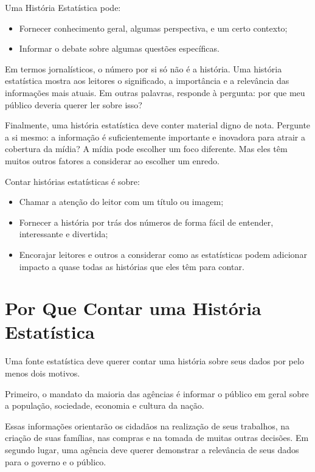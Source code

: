 Uma História Estatística pode:

\begin{itemize}
    \item Fornecer conhecimento geral, algumas perspectiva, e um certo contexto;
    \item Informar o debate sobre algumas questões específicas.
\end{itemize}


Em termos jornalísticos, o número por si só não é a história. Uma história estatística mostra aos leitores o significado, a importância e a relevância das informações mais atuais. Em outras palavras, responde à pergunta: por que meu público deveria querer ler sobre isso?\vskip0.3cm 

Finalmente, uma história estatística deve conter material digno de nota. Pergunte a si mesmo: a informação é suficientemente importante e inovadora para atrair a cobertura da mídia? A mídia pode escolher um foco diferente. Mas eles têm muitos outros fatores a considerar ao escolher um enredo.

Contar histórias estatísticas é sobre:

\begin{itemize}
    \item Chamar a atenção do leitor com um título ou imagem;
    \item Fornecer a história por trás dos números de forma fácil de entender, interessante e divertida;
    \item Encorajar leitores e outros a considerar como as estatísticas podem adicionar impacto a quase todas as histórias que eles têm para contar.
\end{itemize}

\section{Por Que Contar uma História Estatística}

Uma fonte estatística deve querer contar uma história sobre seus dados por pelo menos dois motivos.\vskip0.3cm 

Primeiro, o mandato da maioria das agências é informar o público em geral sobre a população, sociedade, economia e cultura da nação.\vskip0.3cm 

Essas informações orientarão os cidadãos na realização de seus trabalhos, na criação de suas famílias, nas compras e na tomada de muitas outras decisões.
Em segundo lugar, uma agência deve querer demonstrar a relevância de seus dados para o governo e o público.\vskip0.3cm 


